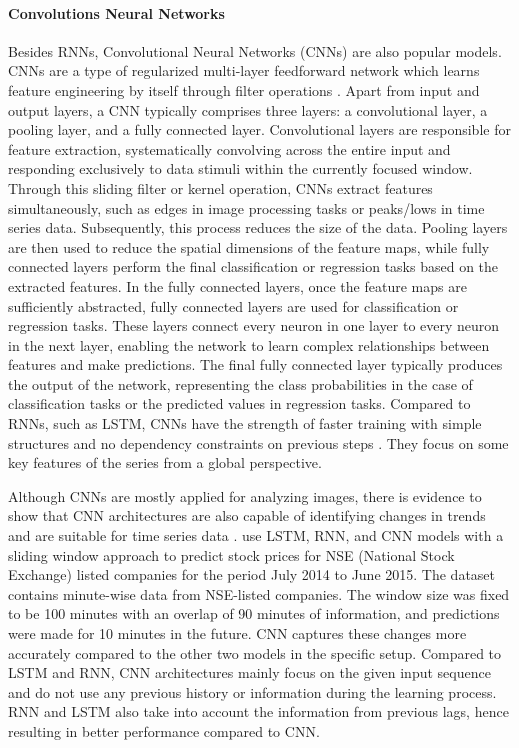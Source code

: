 \documentclass{article}
\begin{document}
\paragraph{Convolutions Neural Networks}
Besides RNNs, Convolutional Neural Networks (CNNs) are also popular models. CNNs are a type of regularized multi-layer feedforward network which learns feature engineering by itself through filter operations \citep{o2015introduction}. Apart from input and output layers, a CNN typically comprises three layers: a convolutional layer, a pooling layer, and a fully connected layer. Convolutional layers are responsible for feature extraction, systematically convolving across the entire input and responding exclusively to data stimuli within the currently focused window. Through this sliding filter or kernel operation, CNNs extract features simultaneously, such as edges in image processing tasks or peaks/lows in time series data. Subsequently, this process reduces the size of the data. Pooling layers are then used to reduce the spatial dimensions of the feature maps, while fully connected layers perform the final classification or regression tasks based on the extracted features. In the fully connected layers, once the feature maps are sufficiently abstracted, fully connected layers are used for classification or regression tasks. These layers connect every neuron in one layer to every neuron in the next layer, enabling the network to learn complex relationships between features and make predictions. The final fully connected layer typically produces the output of the network, representing the class probabilities in the case of classification tasks or the predicted values in regression tasks. Compared to RNNs, such as LSTM, CNNs have the strength of faster training with simple structures and no dependency constraints on previous steps \citep{kirisci2022new}. They focus on some key features of the series from a global perspective.

Although CNNs are mostly applied for analyzing images, there is evidence to show that CNN architectures are also capable of identifying changes in trends and are suitable for time series data \citep{selvin2017stock}. \cite{selvin2017stock} use LSTM, RNN, and CNN models with a sliding window approach to predict stock prices for NSE (National Stock Exchange) listed companies for the period July 2014 to June 2015. The dataset contains minute-wise data from NSE-listed companies. The window size was fixed to be 100 minutes with an overlap of 90 minutes of information, and predictions were made for 10 minutes in the future. CNN captures these changes more accurately compared to the other two models in the specific setup. Compared to LSTM and RNN, CNN architectures mainly focus on the given input sequence and do not use any previous history or information during the learning process. RNN and LSTM also take into account the information from previous lags, hence resulting in better performance compared to CNN.
\end{document}
